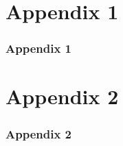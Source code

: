 \documentclass[t,10pt,aspectratio=169]{beamer}
\begin{document}
\appendix

\begin{frame}[plain]
\end{frame}


\section{Appendix 1}

\begin{frame}
   \frametitle{Appendix 1}
\end{frame}

\section{Appendix 2}

\begin{frame}
   \frametitle{Appendix 2}
\end{frame}
\end{document}
